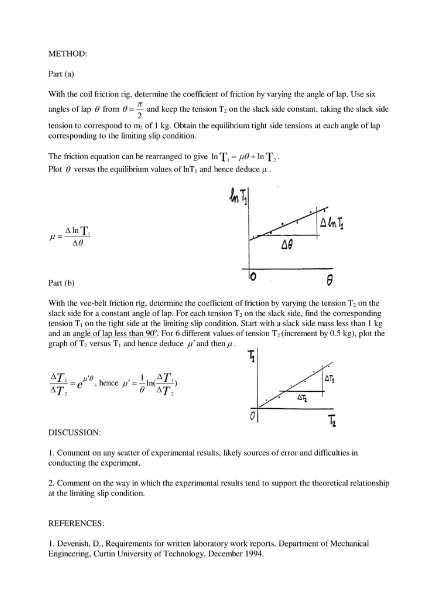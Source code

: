 \documentclass[12pt,a4paper]{report}
\begin{document}
\begin{figure}[H]
 \includegraphics[width=\linewidth]{lab2/lab2-2}
  \caption*{}
\label{}
\end{figure}
\end{document}
